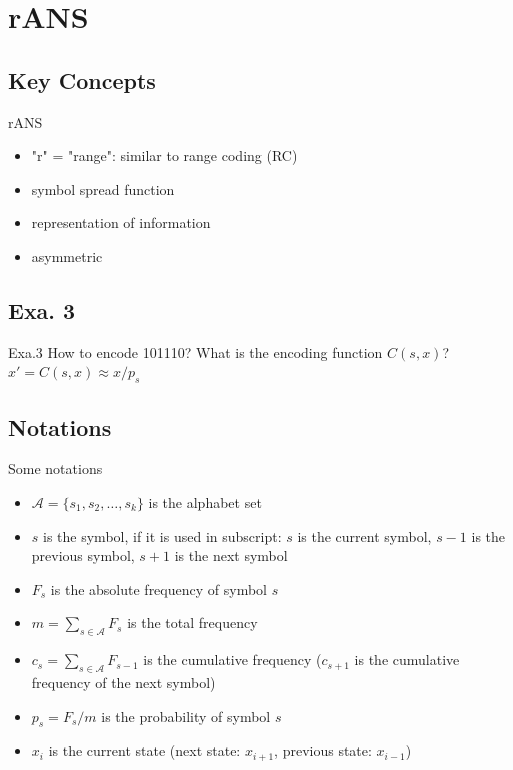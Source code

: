 
\section{rANS}
    \subsection{Key Concepts}
    \begin{frame}[fragile]{rANS}
        \begin{itemize}
            \item "r" = "range": similar to range coding (RC)
            \item symbol spread function
            \item representation of information
            \item asymmetric
        \end{itemize}
    \end{frame}

    \subsection{Exa. 3}
    \begin{frame}[fragile]{Exa.3}
        How to encode 101110? What is the encoding function $\mathit{C(s,x)}$? \ $\mathit{x' = C(s,x) \approx x/p_s}$
    \end{frame}
    
    \subsection{Notations}
    \begin{frame}[fragile]{Some notations}
        \begin{itemize}
            \item $\mathcal{A} = \{\mathit{s_1, s_2, \dots, s_k}\}$ is the alphabet set
            \item $\mathit{s}$ is the symbol, if it is used in subscript: $\mathit{s}$ is the current symbol, $\mathit{s-1}$ is the previous symbol,  $\mathit{s+1}$ is the next symbol
            \item $\mathit{F_s}$ is the absolute frequency of symbol $\mathit{s}$
            \item $\mathit{m = \sum_{s \in \mathcal{A}} F_s}$ is the total frequency
            \item $\mathit{c_s = \sum_{s \in \mathcal{A}} F_{s-1}}$ is the cumulative frequency ($\mathit{c_{s+1}}$ is the cumulative frequency of the next symbol)
            \item $\mathit{p_s = F_s / m}$ is the probability of symbol $\mathit{s}$
            \item $\mathit{x_i}$ is the current state (next state: $\mathit{x_{i+1}}$, previous state: $\mathit{x_{i-1}}$)
        \end{itemize}
    \end{frame}

